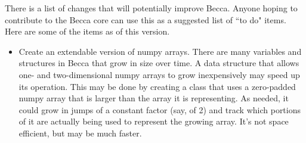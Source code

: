 There is a list of changes that will potentially improve Becca. Anyone hoping to contribute to the Becca core can use this as a suggested list of ``to do" items. Here are some of the items as of this version.

\begin{itemize}
\item{Create an extendable version of numpy arrays. There are many variables and structures in Becca that grow in size over time. A data structure that allows one- and two-dimensional numpy arrays to grow inexpensively may speed up its operation. This may be done by creating a class that uses a zero-padded numpy array that is larger than the array it is representing. As needed, it could grow in jumps of a constant factor (say, of 2) and track which portions of it are actually being used to represent the growing array. It's not space efficient, but may be much faster.}

\end{itemize}